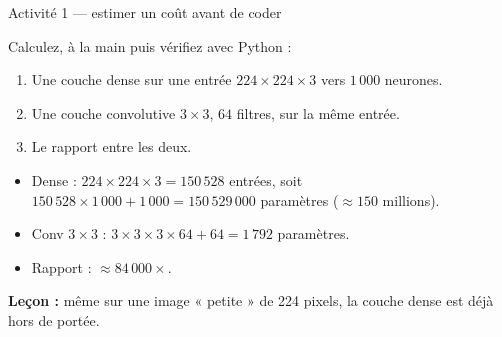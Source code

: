 \begin{frame}{Activité 1 --- estimer un coût avant de coder}
\begin{abox}
Calculez, à la main puis vérifiez avec Python :
\begin{enumerate}
  \item Une couche dense sur une entrée $224 \times 224 \times 3$ vers
  $1\,000$ neurones.
  \item Une couche convolutive $3 \times 3$, $64$ filtres, sur la même entrée.
  \item Le rapport entre les deux.
\end{enumerate}
\end{abox}
\begin{solbox}[Correction]
\begin{itemize}
  \item Dense : $224 \times 224 \times 3 = 150\,528$ entrées, soit
  $150\,528 \times 1\,000 + 1\,000 = 150\,529\,000$ paramètres
  ($\approx 150$ millions).
  \item Conv $3 \times 3$ : $3 \times 3 \times 3 \times 64 + 64 = 1\,792$ paramètres.
  \item Rapport : $\approx 84\,000\times$.
\end{itemize}
\medskip
\textbf{Leçon :} même sur une image « petite » de 224 pixels, la couche dense
est déjà hors de portée.
\end{solbox}
\end{frame}

